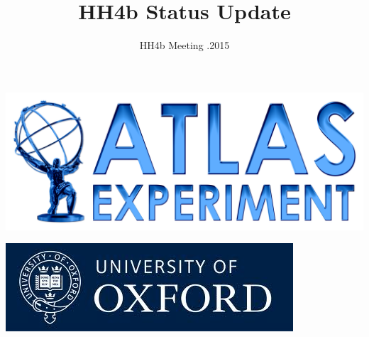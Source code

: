 
\title[HH4b Study]{\textbf{HH4b Status Update}}
\date{HH4b Meeting .2015}

\begin{frame}
\titlepage
\hspace{1.0cm}
\begin{minipage}{0.45\textwidth}
  \begin{center}
  \includegraphics[scale=0.07]{ATLASlogo.png}
  \end{center}
\end{minipage}
\hspace{-1.4cm}
\begin{minipage}{0.45\textwidth}
  \begin{center}
  \includegraphics[scale=0.2]{Oxfordlogo.jpg}
  \end{center}
\end{minipage}
\end{frame}


